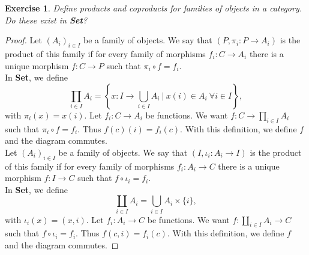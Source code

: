 \documentclass[a4paper, 11pt]{book}
\theoremstyle{plain}
\newtheorem{exercise}[theorem]{Exercise}
\theoremstyle{plain}
\begin{document}
\begin{exercise}
Define products and coproducts for families of objects in a category. Do these exist in \textbf{Set}?
\end{exercise}
\begin{proof}
Let $(A_i)_{i\in I}$ be a family of objects. We say that $(P, \pi_i:P\rightarrow A_i)$ is the product of this family if for every family of morphisms $f_i:C\rightarrow A_i$ there is a unique morphism $f:C\rightarrow P$ such that $\pi_i\circ f=f_i$.\\
In \textbf{Set}, we define
$$\prod_{i\in I} A_i = \left\{x:I\rightarrow \bigcup_{i\in I}A_i~\vert~x(i)\in A_i~\forall i\in I \right\},$$
with $\pi_i(x) = x(i)$. Let $f_i:C\rightarrow A_i$ be functions. We want $f:C\rightarrow \prod_{i \in I} A_i$ such that $\pi_i\circ f=f_i$. Thus $f(c)(i)=f_i(c)$. With this definition, we define $f$ and the diagram commutes.\\
Let $(A_i)_{i\in I}$ be a family of objects. We say that $(I, \iota_i: A_i\rightarrow I)$ is the product of this family if for every family of morphisms $f_i:A_i\rightarrow C$ there is a unique morphism $f:I\rightarrow C$ such that $f\circ \iota_i=f_i$.\\
In \textbf{Set}, we define
$$\coprod_{i\in I} A_i = \bigcup_{i\in I} A_i\times \{i\},$$
with $\iota_i(x)=(x,i)$. Let $f_i:A_i\rightarrow C$ be functions. We want $f:\coprod_{i \in I} A_i\rightarrow C$ such that $ f\circ \iota_i=f_i$. Thus $f(c,i)=f_i(c)$. With this definition, we define $f$ and the diagram commutes.
\end{proof}
\end{document}
